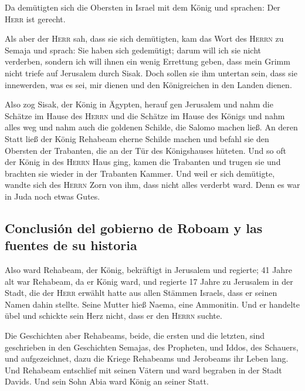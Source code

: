  Da demütigten sich die Obersten in Israel mit dem König
und sprachen: Der \textsc{Herr} ist gerecht.

 Als aber der \textsc{Herr} sah, dass sie sich demütigten,
kam das Wort des \textsc{Herrn} zu Semaja und sprach: Sie haben sich
gedemütigt; darum will ich sie nicht verderben, sondern ich will ihnen
ein wenig Errettung geben, dass mein Grimm nicht triefe auf Jerusalem
durch Sisak.  Doch sollen sie ihm untertan sein, dass sie
innewerden, was es sei, mir dienen und den Königreichen in den Landen
dienen.

 Also zog Sisak, der König in Ägypten, herauf gen
Jerusalem und nahm die Schätze im Hause des \textsc{Herrn} und die
Schätze im Hause des Königs und nahm alles weg und nahm auch die
goldenen Schilde, die Salomo machen ließ.  An deren Statt
ließ der König Rehabeam eherne Schilde machen und befahl sie den
Obersten der Trabanten, die an der Tür des Königshauses hüteten.
 Und so oft der König in des \textsc{Herrn} Haus ging,
kamen die Trabanten und trugen sie und brachten sie wieder in der
Trabanten Kammer.  Und weil er sich demütigte, wandte
sich des \textsc{Herrn} Zorn von ihm, dass nicht alles verderbt ward.
Denn es war in Juda noch etwas Gutes.

\hypertarget{conclusiuxf3n-del-gobierno-de-roboam-y-las-fuentes-de-su-historia}{%
\subsection{Conclusión del gobierno de Roboam y las fuentes de su
historia}\label{conclusiuxf3n-del-gobierno-de-roboam-y-las-fuentes-de-su-historia}}

 Also ward Rehabeam, der König, bekräftigt in Jerusalem
und regierte; 41 Jahre alt war Rehabeam, da er König ward, und regierte
17 Jahre zu Jerusalem in der Stadt, die der \textsc{Herr} erwählt hatte
aus allen Stämmen Israels, dass er seinen Namen dahin stellte. Seine
Mutter hieß Naema, eine Ammonitin.  Und er handelte übel
und schickte sein Herz nicht, dass er den \textsc{Herrn} suchte.

 Die Geschichten aber Rehabeams, beide, die ersten und
die letzten, sind geschrieben in den Geschichten Semajas, des Propheten,
und Iddos, des Schauers, und aufgezeichnet, dazu die Kriege Rehabeams
und Jerobeams ihr Leben lang.  Und Rehabeam entschlief
mit seinen Vätern und ward begraben in der Stadt Davids. Und sein Sohn
Abia ward König an seiner Statt.

